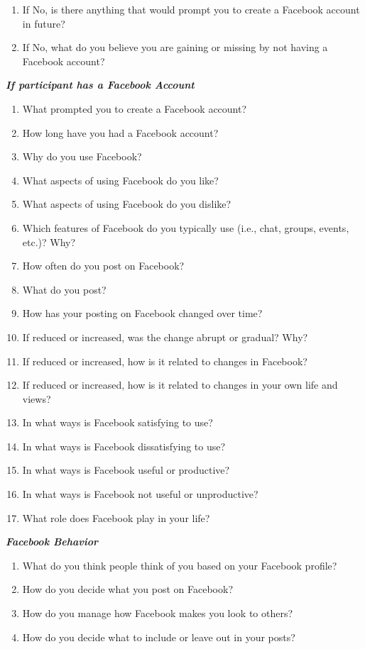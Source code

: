 \begin{appendices}
\begin{enumerate}
\item If No, is there anything that would prompt you to create a Facebook account in future?
\item If No, what do you believe you are gaining or missing by not having a Facebook account?
\end{enumerate}
\textbf{\textit{If participant has a Facebook Account}}
\begin{enumerate}
\item What prompted you to create a Facebook account?
\item How long have you had a Facebook account?
\item Why do you use Facebook?
\item What aspects of using Facebook do you like?
\item What aspects of using Facebook do you dislike?
\item Which features of Facebook do you typically use (i.e., chat, groups, events, etc.)? Why?
\item How often do you post on Facebook?
\item What do you post?
\item How has your posting on Facebook changed over time?
\item If reduced or increased, was the change abrupt or gradual? Why?
\item If reduced or increased, how is it related to changes in Facebook?
\item If reduced or increased, how is it related to changes in your own life and views?
\item In what ways is Facebook satisfying to use?
\item In what ways is Facebook dissatisfying to use?
\item In what ways is Facebook useful or productive?
\item In what ways is Facebook not useful or unproductive?
\item What role does Facebook play in your life?
\end{enumerate}
\textbf{\textit{Facebook Behavior}}
\begin{enumerate}
\item What do you think people think of you based on your Facebook profile?
\item How do you decide what you post on Facebook?
\item How do you manage how Facebook makes you look to others?
\item How do you decide what to include or leave out in your posts?

\end{enumerate}
\end{appendices}

